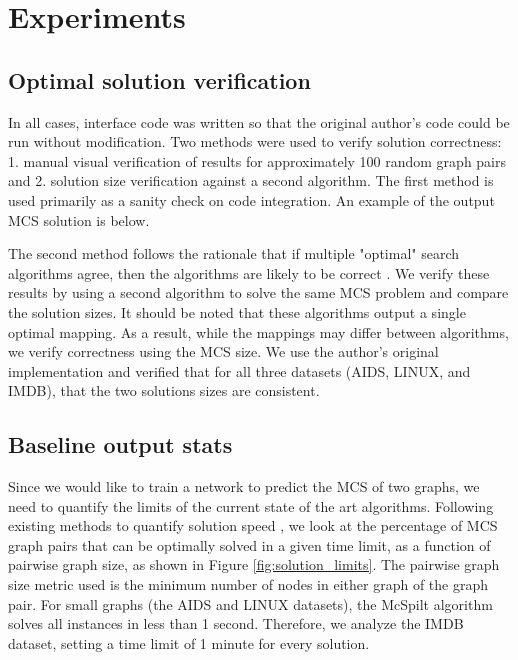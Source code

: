 \section{Experiments}
\subsection{Optimal solution verification}
In all cases, interface code was written so that the original author's code could be run without modification. Two methods were used to verify solution correctness: 1. manual visual verification of results for approximately 100 random graph pairs and 2. solution size verification against a second algorithm. The first method is used primarily as a sanity check on code integration. An example of the output MCS solution is below. 


The second method follows the rationale that if multiple "optimal" search algorithms agree, then the algorithms are likely to be correct \cite{korf2014you}. We verify these results by using a second algorithm \cite{mccreesh2016clique} to solve the same MCS problem and compare the solution sizes. It should be noted that these algorithms output a single optimal mapping. As a result, while the mappings may differ between algorithms, we verify correctness using the MCS size. We use the author's original implementation and verified that for all three datasets (AIDS, LINUX, and IMDB), that the two solutions sizes are consistent.

\subsection{Baseline output stats}
Since we would like to train a network to predict the MCS of two graphs, we need to quantify the limits of the current state of the art algorithms. Following existing methods to quantify solution speed \cite{hoffmann2018observations}, we look at the percentage of MCS graph pairs that can be optimally solved in a given time limit, as a function of pairwise graph size, as shown in Figure \ref{fig:solution_limits}. The pairwise graph size metric used is the minimum number of nodes in either graph of the graph pair. For small graphs (the AIDS and LINUX datasets), the McSpilt algorithm solves all instances in less than 1 second. Therefore, we analyze the IMDB dataset, setting a time limit of 1 minute for every solution.

